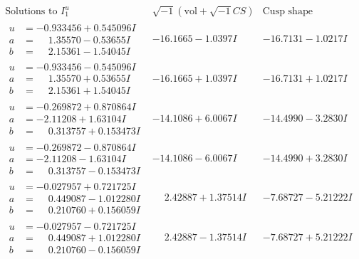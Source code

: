 \documentclass[1p]{elsarticle_modified}
\theoremstyle{definition}
\newcommand{\I}{\sqrt{-1}}
\begin{document}
$$\begin{array}{c|c|c}  
\text{Solutions to }I^u_{1}& \I (\text{vol} + \sqrt{-1}CS) & \text{Cusp shape}\\
 \hline 
\begin{aligned}
u &= -0.933456 + 0.545096 I \\
a &= \phantom{-}1.35570 - 0.53655 I \\
b &= \phantom{-}2.15361 - 1.54045 I\end{aligned}
 & -16.1665 - 1.0397 I & -16.7131 - 1.0217 I \\ \hline\begin{aligned}
u &= -0.933456 - 0.545096 I \\
a &= \phantom{-}1.35570 + 0.53655 I \\
b &= \phantom{-}2.15361 + 1.54045 I\end{aligned}
 & -16.1665 + 1.0397 I & -16.7131 + 1.0217 I \\ \hline\begin{aligned}
u &= -0.269872 + 0.870864 I \\
a &= -2.11208 + 1.63104 I \\
b &= \phantom{-}0.313757 + 0.153473 I\end{aligned}
 & -14.1086 + 6.0067 I & -14.4990 - 3.2830 I \\ \hline\begin{aligned}
u &= -0.269872 - 0.870864 I \\
a &= -2.11208 - 1.63104 I \\
b &= \phantom{-}0.313757 - 0.153473 I\end{aligned}
 & -14.1086 - 6.0067 I & -14.4990 + 3.2830 I \\ \hline\begin{aligned}
u &= -0.027957 + 0.721725 I \\
a &= \phantom{-}0.449087 - 1.012280 I \\
b &= \phantom{-}0.210760 + 0.156059 I\end{aligned}
 & \phantom{-}2.42887 + 1.37514 I & -7.68727 - 5.21222 I \\ \hline\begin{aligned}
u &= -0.027957 - 0.721725 I \\
a &= \phantom{-}0.449087 + 1.012280 I \\
b &= \phantom{-}0.210760 - 0.156059 I\end{aligned}
 & \phantom{-}2.42887 - 1.37514 I & -7.68727 + 5.21222 I \\ \hline\begin{aligned}

\end{aligned}
\end{array}$$
\end{document}
